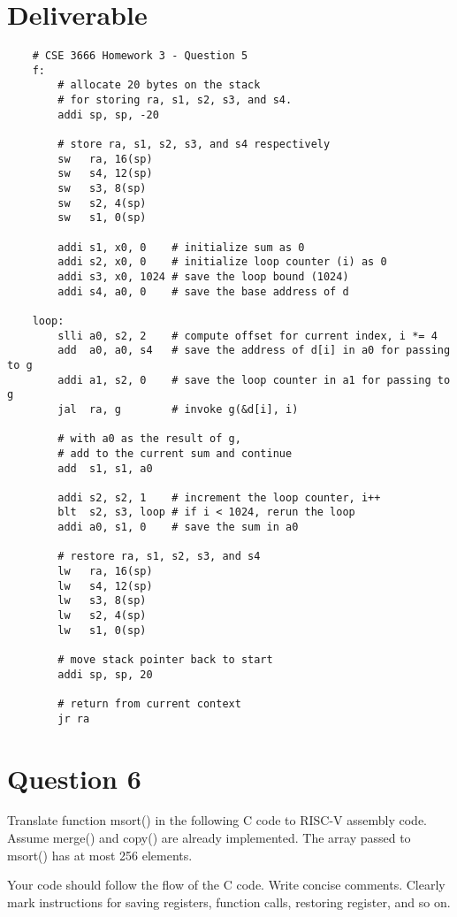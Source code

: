 \documentclass{article}
\begin{document}
\section{Deliverable}
    \begin{lstlisting}
    # CSE 3666 Homework 3 - Question 5
    f:
        # allocate 20 bytes on the stack
        # for storing ra, s1, s2, s3, and s4.
        addi sp, sp, -20

        # store ra, s1, s2, s3, and s4 respectively
        sw   ra, 16(sp)
        sw   s4, 12(sp)
        sw   s3, 8(sp)
        sw   s2, 4(sp)
        sw   s1, 0(sp)

        addi s1, x0, 0    # initialize sum as 0
        addi s2, x0, 0    # initialize loop counter (i) as 0
        addi s3, x0, 1024 # save the loop bound (1024)
        addi s4, a0, 0    # save the base address of d

    loop:
        slli a0, s2, 2    # compute offset for current index, i *= 4
        add  a0, a0, s4   # save the address of d[i] in a0 for passing to g
        addi a1, s2, 0    # save the loop counter in a1 for passing to g
        jal  ra, g        # invoke g(&d[i], i)

        # with a0 as the result of g,
        # add to the current sum and continue
        add  s1, s1, a0
        
        addi s2, s2, 1    # increment the loop counter, i++
        blt  s2, s3, loop # if i < 1024, rerun the loop
        addi a0, s1, 0    # save the sum in a0
        
        # restore ra, s1, s2, s3, and s4
        lw   ra, 16(sp)
        lw   s4, 12(sp)
        lw   s3, 8(sp)
        lw   s2, 4(sp)
        lw   s1, 0(sp)

        # move stack pointer back to start
        addi sp, sp, 20

        # return from current context
        jr ra
    \end{lstlisting}

\break
\section{Question 6}
Translate function msort() in the following C code to RISC-V assembly code. Assume merge() and copy() are already implemented. The array passed to msort() has at most 256 elements.

\hfill \break
Your code should follow the flow of the C code. Write concise comments. Clearly mark instructions for saving registers, function calls, restoring register, and so on.
\end{document}
